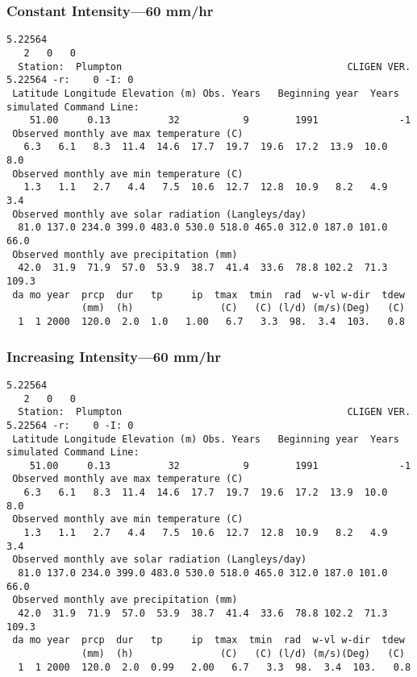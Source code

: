 \subsubsection{Constant Intensity---60 mm/hr}
\label{sec:ConstantIntensity60MmHr}

\begin{verbatim}
5.22564
   2   0   0
  Station:  Plumpton                                       CLIGEN VER. 5.22564 -r:    0 -I: 0
 Latitude Longitude Elevation (m) Obs. Years   Beginning year  Years simulated Command Line:
    51.00     0.13          32           9        1991              -1
 Observed monthly ave max temperature (C)
   6.3   6.1   8.3  11.4  14.6  17.7  19.7  19.6  17.2  13.9  10.0   8.0
 Observed monthly ave min temperature (C)
   1.3   1.1   2.7   4.4   7.5  10.6  12.7  12.8  10.9   8.2   4.9   3.4
 Observed monthly ave solar radiation (Langleys/day)
  81.0 137.0 234.0 399.0 483.0 530.0 518.0 465.0 312.0 187.0 101.0  66.0
 Observed monthly ave precipitation (mm)
  42.0  31.9  71.9  57.0  53.9  38.7  41.4  33.6  78.8 102.2  71.3 109.3
 da mo year  prcp  dur   tp     ip  tmax  tmin  rad  w-vl w-dir  tdew
             (mm)  (h)               (C)   (C) (l/d) (m/s)(Deg)   (C)
  1  1 2000  120.0  2.0  1.0   1.00   6.7   3.3  98.  3.4  103.   0.8
\end{verbatim}

\subsubsection{Increasing Intensity---60 mm/hr}
\label{sec:IncreasingIntensity60MmHr}

\begin{verbatim}
5.22564
   2   0   0
  Station:  Plumpton                                       CLIGEN VER. 5.22564 -r:    0 -I: 0
 Latitude Longitude Elevation (m) Obs. Years   Beginning year  Years simulated Command Line:
    51.00     0.13          32           9        1991              -1
 Observed monthly ave max temperature (C)
   6.3   6.1   8.3  11.4  14.6  17.7  19.7  19.6  17.2  13.9  10.0   8.0
 Observed monthly ave min temperature (C)
   1.3   1.1   2.7   4.4   7.5  10.6  12.7  12.8  10.9   8.2   4.9   3.4
 Observed monthly ave solar radiation (Langleys/day)
  81.0 137.0 234.0 399.0 483.0 530.0 518.0 465.0 312.0 187.0 101.0  66.0
 Observed monthly ave precipitation (mm)
  42.0  31.9  71.9  57.0  53.9  38.7  41.4  33.6  78.8 102.2  71.3 109.3
 da mo year  prcp  dur   tp     ip  tmax  tmin  rad  w-vl w-dir  tdew
             (mm)  (h)               (C)   (C) (l/d) (m/s)(Deg)   (C)
  1  1 2000  120.0  2.0  0.99   2.00   6.7   3.3  98.  3.4  103.   0.8
\end{verbatim}

